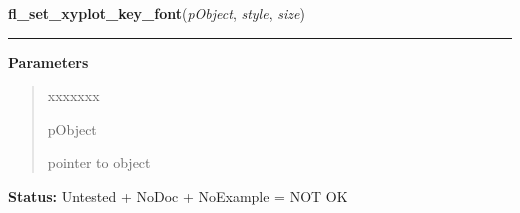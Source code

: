 \hspace{.8\funcindent}\begin{boxedminipage}{\funcwidth}

    \raggedright \textbf{fl\_set\_xyplot\_key\_font}(\textit{pObject}, \textit{style}, \textit{size})

    \vspace{-1.5ex}

    \rule{\textwidth}{0.5\fboxrule}
\setlength{\parskip}{2ex}
\setlength{\parskip}{1ex}
      \textbf{Parameters}
      \vspace{-1ex}

      \begin{quote}
        \begin{Ventry}{xxxxxxx}

          \item[pObject]

          pointer to object

        \end{Ventry}

      \end{quote}

\textbf{Status:} Untested + NoDoc + NoExample = NOT OK



    \end{boxedminipage}

    \label{xformslib:library:fl_get_xyplot_numdata}

    \vspace{0.5ex}

